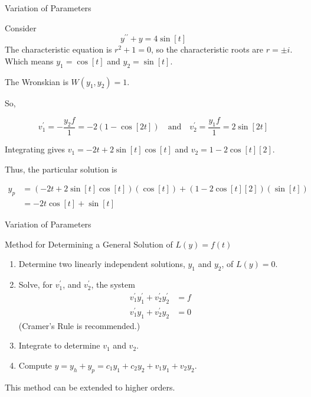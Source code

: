 \documentclass{beamer}
\begin{document}
\begin{frame}{Variation of Parameters}
\begin{example}
Consider
\begin{equation*}
y^{\prime\prime}+y=4\sin[t]
\end{equation*}\pause
The characteristic equation is $r^2+1=0$, so the characteristic roots are $r=\pm i$. Which means $y_1=\cos[t]$ and $y_2=\sin[t]$.\pause

\vspace{2mm}
The Wronskian is $W(y_1,y_2)=1$.\pause

\vspace{2mm}
So,

\vspace{-4mm}
\begin{equation*}
v_1^\prime = -\dfrac{y_2 f}{1} = -2(1-\cos[2t])
\quad\text{and}\quad
v_2^\prime = \dfrac{y_1 f}{1} = 2\sin[2t]
\end{equation*}\pause

\vspace{-4mm}
Integrating gives $v_1=-2t+2\sin[t]\cos[t]$ and $v_2=1-2\cos[t][2]$.\pause

\vspace{2mm}
Thus, the particular solution is

\vspace{-2mm}
\begin{equation*}
\begin{aligned}
y_p&=(-2t+2\sin[t]\cos[t])(\cos[t])+(1-2\cos[t][2])(\sin[t])\\
&=-2t\cos[t]+\sin[t]
\end{aligned}
\end{equation*}
\end{example}
\end{frame}

\begin{frame}{Variation of Parameters}
\begin{block}{Method for Determining a General Solution of $L(y)=f(t)$}
\begin{enumerate}[<+- | alert@+>]
\item Determine two linearly independent solutions, $y_1$ and $y_2$, of $L(y)=0$.
\item Solve, for $v_1^\prime$, and $v_2^\prime$, the system \begin{equation*}
\begin{aligned}
v_1^\prime y_1^\prime + v_2^\prime y_2^\prime &=f\\
v_1^\prime y_1 + v_2^\prime y_2&=0
\end{aligned}
\end{equation*}
(Cramer's Rule is recommended.)
\item Integrate to determine $v_1$ and $v_2$.
\item Compute $y=y_h+y_p=c_1 y_1+c_2 y_2 + v_1 y_1 + v_2 y_2$.
\end{enumerate}
\onslide<+->
\end{block}
\begin{block}{}
This method can be extended to higher orders.
\end{block}
\end{frame}
\end{document}
